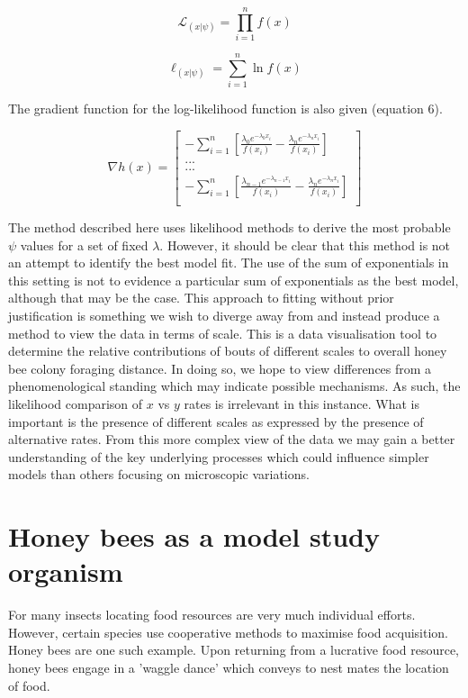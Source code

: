 \documentclass[11pt,usenames,dvipsnames]{article}
\newcommand{\Lagr}{\mathcal{L}}
\begin{document}
\begin{equation}
\Lagr_{(x|\psi)} = \prod_{i=1}^{n} f(x)
\end{equation} 

\begin{equation}
\ell_{(x|\psi)} = \sum_{i=1}^{n} \ln f(x)
\end{equation} 

The gradient function for the log-likelihood function is also given (equation 6).

\begin{equation}
\nabla h(x) = \begin{bmatrix} -\sum_{i=1}^{n} [\frac{\lambda_0 e^{-\lambda_0 x_i}}{f(x_i)} - \frac{\lambda_n e^{-\lambda_n x_i}}{f(x_i)}] \\
... \\
... \\
-\sum_{i=1}^{n} [\frac{\lambda_{n-1} e^{-\lambda_{n-1} x_i}}{f(x_i)} - \frac{\lambda_n e^{-\lambda_n x_i}}{f(x_i)}] \\
\end{bmatrix}
\end{equation}

The method described here uses likelihood methods to derive the most probable $\psi$ values for a set of fixed $\lambda$. However, it should be clear that this method is not an attempt to identify the best model fit. The use of the sum of exponentials in this setting is not to evidence a particular sum of exponentials as the best model, although that may be the case. This approach to fitting without prior justification is something we wish to diverge away from and instead produce a method to view the data in terms of scale. This is a data visualisation tool to determine the relative contributions of bouts of different scales to overall honey bee colony foraging distance. In doing so, we hope to view differences from a phenomenological standing which may indicate possible mechanisms. As such, the likelihood comparison of $x$ vs $y$ rates is irrelevant in this instance. What is important is the presence of different scales as expressed by the presence of alternative rates. From this more complex view of the data we may gain a better understanding of the key underlying processes which could influence simpler models than others focusing on microscopic variations. 



\section{Honey bees as a model study organism}
For many insects locating food resources are very much individual efforts. However, certain species use cooperative methods to maximise food acquisition. Honey bees are one such example. Upon returning from a lucrative food resource, honey bees engage in a 'waggle dance' which conveys to nest mates the location of food.   
\end{document}
